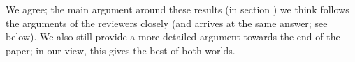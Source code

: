 \reply
We agree; the main argument around these results (in section )
we think follows the arguments of the reviewers closely
(and arrives at the same answer; see below).
We also still provide a more detailed argument towards the end of the paper;
in our view, this gives the best of both worlds.











